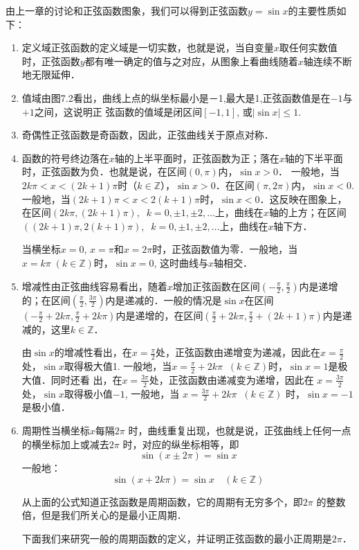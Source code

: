 由上一章的讨论和正弦函数图象，我们可以得到正弦函数$y=\sin x$的主要性质如下：
\begin{enumerate}
    \item 定义域\quad 正弦函数的定义域是一切实数，也就是说，当自变量$x$取任何实数值时，正弦函数$y$都有唯一确定的值与之对应，从图象上看曲线随着$x$轴连续不断地无限延伸．
    \item 值域\quad 由图7.2看出，曲线上点的纵坐标最小是－1,最大是1,正弦函数值是在$-1$与$+1$之间，这说明正
    弦函数的值域是闭区间$[-1, 1]$, 或$|\sin x|\le 1$.
    \item 奇偶性\quad 正弦函数是奇函数，因此，正弦曲线关于原点对称．
    \item 函数的符号\quad 终边落在$x$轴的上半平面时，正弦函数为正；落在$x$轴的下半平面时，正弦函数为负．也就是说，在区间$(0,\pi)$内，$\sin x>0$． 一般地，当$2k\pi <x<(2k+1)\pi$时（$k\in\mathbb{Z}$），$\sin x>0$．在区间$(\pi,2\pi)$内，$\sin x<0$. 一般地，当$(2k+1)\pi<x<2(k+1)\pi$时，$\sin x<0$．这反映在图象上，在区间$(2k\pi, (2k+1)\pi),\;\; k=0,\pm1,\pm2,\ldots$上，曲线在$x$轴的上方；在区间$((2k+1)\pi, 2(k+1)\pi),\;\; k=0,\pm1,\pm2,\ldots$上，曲线在$x$轴下方．
    
    当横坐标$x=0$, $x=\pi$和$x=2\pi$时，正弦函数值为零．一般地，当$x=k\pi\; (k\in \mathbb{Z})$时，$\sin x=0$, 这时曲线与$x$轴相交．

    \item 增减性\quad 由正弦曲线容易看出，随着$x$增加正弦函数在区间$\left(-\frac{\pi}{2},\frac{\pi}{2}\right)$内是递增的；在区间$\left(\frac{\pi}{2},\frac{3\pi}{2}\right)$内是递减的．一般的情况是$\sin x$在区间$\left(-\frac{\pi}{2}+2k\pi,\frac{\pi}{2}+2k\pi\right)$内是递增的，在区间$\left(\frac{\pi}{2}+2k\pi,\frac{\pi}{2}+(2k+1)\pi\right)$内是递减的，这里$k\in \mathbb{Z}$．
    
    由$\sin x$的增减性看出，在$x=\frac{\pi}{2}$处，正弦函数由递增变为递减，因此在$x=\frac{\pi}{2}$处，$\sin x$取得极大值1. 一般地，当$x=\frac{\pi}{2}+2k\pi\;\; (k\in\mathbb{Z})$时，$\sin x=1$是极大值．同时还看
    出，在$x=\frac{3\pi}{2}$处，正弦函数由递减变为递增，因此在
    $x=\frac{3\pi}{2}$处，$\sin x$取得极小值$-1$, 一般地，当
    $x=\frac{3\pi}{2}+2k\pi\;\; (k\in\mathbb{Z})$
    时，$\sin x=-1$是极小值．
    \item 周期性\quad 当横坐标$x$每隔$2\pi$ 时，曲线重复出现，也就是说，正弦曲线上任何一点的横坐标加上或减去$2\pi$ 时，对应的纵坐标相等，即
\[\sin(x\pm 2\pi)=\sin x\]
一般地：
\[\sin(x+2k\pi)=\sin x\quad (k\in\mathbb{Z})\]

从上面的公式知道正弦函数是周期函数，它的周期有无穷多个，即$2\pi$ 的整数倍，但是我们所关心的是最小正周期．

下面我们来研究一般的周期函数的定义，并证明正弦函数的最小正周期是$2\pi$．
\end{enumerate}

